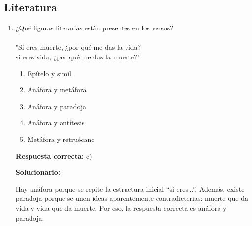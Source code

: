 \subsection*{Literatura}

\begin{enumerate}[resume]
	
	\item ¿Qué figuras literarias están presentes en los versos?\\\\
	"Si eres muerte, ¿por qué me das la vida?\\ 
	si eres vida, ¿por qué me das la muerte?"
	
	\begin{enumerate}[label=\alph*)]
		\item Epítelo y simil
		\item Anáfora y metáfora
		\item Anáfora y paradoja
		\item Anáfora y antítesis
		\item Metáfora y retruécano
	\end{enumerate}
	
	\textbf{Respuesta correcta:} c)
	
	\vspace{2mm}
	\textbf{Solucionario:}
	
	Hay anáfora porque se repite la estructura inicial ``si eres...''. Además, existe paradoja porque se unen ideas aparentemente contradictorias: muerte que da vida y vida que da muerte. Por eso, la respuesta correcta es anáfora y paradoja.
	
\end{enumerate}

